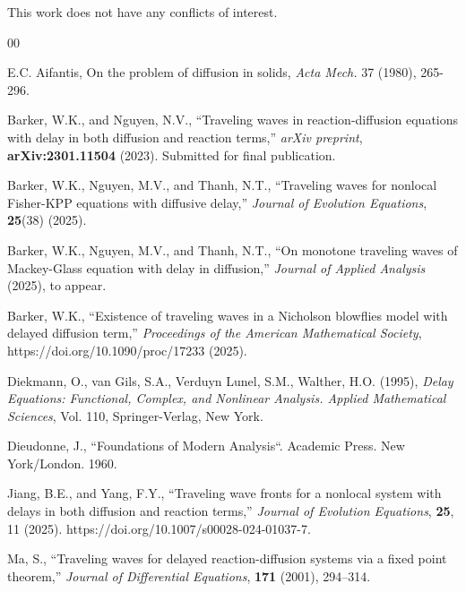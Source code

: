 \documentclass[12pt,letterpaper]{amsart}
\theoremstyle{definition}
\theoremstyle{remark}
\numberwithin{equation}{section}
\begin{document}
This work does not have any conflicts of interest.
\begin{thebibliography}{00}








 E.C. Aifantis, On the problem of diffusion in solids, {\it Acta Mech.}  37 (1980), 265-296.




Barker, W.K., and Nguyen, N.V., ``Traveling waves in reaction-diffusion equations with delay in both diffusion and reaction terms,'' \textit{arXiv preprint}, \textbf{arXiv:2301.11504} (2023). Submitted for final publication.




Barker, W.K., Nguyen, M.V., and Thanh, N.T., ``Traveling waves for nonlocal Fisher-KPP equations with diffusive delay,'' \textit{Journal of Evolution Equations}, \textbf{25}(38) (2025).




Barker, W.K., Nguyen, M.V., and Thanh, N.T., ``On monotone traveling waves of Mackey-Glass equation with delay in diffusion,'' \textit{Journal of Applied Analysis} (2025), to appear.




Barker, W.K., ``Existence of traveling waves in a Nicholson blowflies model with delayed diffusion term,'' \textit{Proceedings of the American Mathematical Society}, https://doi.org/10.1090/proc/17233 (2025).




Diekmann, O., van Gils, S.A., Verduyn Lunel, S.M.,  Walther, H.O. (1995),
\textit{Delay Equations: Functional, Complex, and Nonlinear Analysis.
Applied Mathematical Sciences}, Vol. 110, Springer-Verlag, New York.




 Dieudonne, J., ``Foundations of Modern Analysis``. Academic Press. New York/London. 1960.






Jiang, B.E., and Yang, F.Y., ``Traveling wave fronts for a nonlocal system with delays in both diffusion and reaction terms,'' \textit{Journal of Evolution Equations}, \textbf{25}, 11 (2025). https://doi.org/10.1007/s00028-024-01037-7.
 
Ma, S., ``Traveling waves for delayed reaction-diffusion systems via a fixed point theorem,'' \textit{Journal of Differential Equations}, \textbf{171} (2001), 294–314.





\end{thebibliography}
\end{document}
